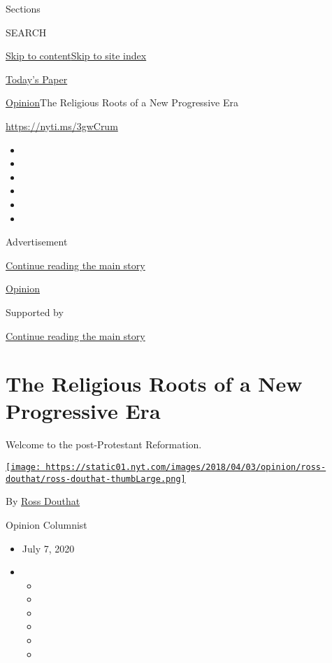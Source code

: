 Sections

SEARCH

\protect\hyperlink{site-content}{Skip to
content}\protect\hyperlink{site-index}{Skip to site index}

\href{https://myaccount.nytimes.com/auth/login?response_type=cookie\&client_id=vi}{}

\href{https://www.nytimes.com/section/todayspaper}{Today's Paper}

\href{/section/opinion}{Opinion}\textbar{}The Religious Roots of a New
Progressive Era

\href{https://nyti.ms/3gwCrum}{https://nyti.ms/3gwCrum}

\begin{itemize}
\item
\item
\item
\item
\item
\item
\end{itemize}

Advertisement

\protect\hyperlink{after-top}{Continue reading the main story}

\href{/section/opinion}{Opinion}

Supported by

\protect\hyperlink{after-sponsor}{Continue reading the main story}

\hypertarget{the-religious-roots-of-a-new-progressive-era}{%
\section{The Religious Roots of a New Progressive
Era}\label{the-religious-roots-of-a-new-progressive-era}}

Welcome to the post-Protestant Reformation.

\href{https://www.nytimes.com/by/ross-douthat}{\texttt{[image: https://static01.nyt.com/images/2018/04/03/opinion/ross-douthat/ross-douthat-thumbLarge.png]}}

By \href{https://www.nytimes.com/by/ross-douthat}{Ross Douthat}

Opinion Columnist

\begin{itemize}
\item
  July 7, 2020
\item
  \begin{itemize}
  \item
  \item
  \item
  \item
  \item
  \item
  \end{itemize}
\end{itemize}

